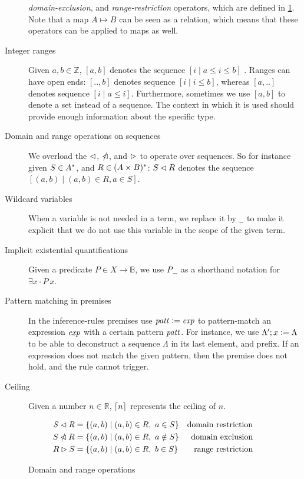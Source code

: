 \begin{description}
  \textit{domain-exclusion}, and \textit{range-restriction} operators, which
  are defined in \cref{fig:domain-and-range-ops}. Note that a map $A \mapsto B$
  can be seen as a relation, which means that these operators can be
  applied to maps as well.
\item[Integer ranges] Given $a, b \in \mathbb{Z}$, $[a, b]$ denotes the
  sequence $[i \mid a \leq i \leq b]$ . Ranges can have open ends: $[.., b]$
  denotes sequence $[i \mid i \leq b]$, whereas $[a, ..]$ denotes sequence
  $[i \mid a \leq i]$. Furthermore, sometimes we use $[a, b]$ to denote a set
  instead of a sequence. The context in which it is used should provide enough
  information about the specific type.
\item[Domain and range operations on sequences] We overload the $\lhd$,
  $\mathbin{\slashed{\lhd}}$, and $\rhd$ to operate over sequences. So for
  instance given $S \in A^{*}$, and $R \in (A \times B)^{*}$:
  $S \lhd R$ denotes the sequence
  $[ (a, b) \mid (a, b) \in R, a \in S]$.
\item[Wildcard variables] When a variable is not needed in a term, we replace
  it by $\wcard$ to make it explicit that we do not use this variable in the
  scope of the given term.
\item[Implicit existential quantifications] Given a predicate
  $P \in X \to \mathbb{B}$, we use $P \wcard$ as a shorthand notation for
  $\exists x \cdot P~x$.

\item[Pattern matching in premises] In the inference-rules premises use
  $\mathit{patt} \mathrel{\mathop:}= \mathit{exp}$ to pattern-match an expression $\mathit{exp} $
  with a certain pattern $\mathit{patt}$. For instance, we use
  $\Lambda'; x \mathrel{\mathop:}= \Lambda$ to be able to deconstruct a sequence $\Lambda$
  in its last element, and prefix. If an expression does not match the given
  pattern, then the premise does not hold, and the rule cannot trigger.

\item[Ceiling] Given a number $n \in \mathbb{R}$, $\lceil n\rceil$ represents the
  ceiling of $n$.
\end{description}

\begin{figure}[htb]
  \begin{align*}
    \mathit{S} \lhd \mathit{R}
    & = \{ (a, b) \mid (a, b) \in R, ~ a \in S \}
    & \text{domain restriction}
    \\
    S \mathbin{\slashed{\lhd}} R
    & = \{ (a, b) \mid (a, b) \in R, ~ a \notin S \}
    & \text{domain exclusion}
    \\
    R \rhd S
    & = \{ (a, b) \mid (a, b) \in R, ~ b \in S \}
    & \text{range restriction}
  \end{align*}
  \caption{Domain and range operations}
  \label{fig:domain-and-range-ops}
\end{figure}